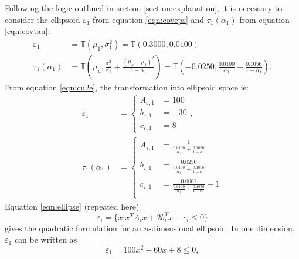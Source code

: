 \begin{example}
Following the logic outlined in section \ref{section:explanation}, it is
necessary to consider the ellipsoid $\varepsilon_1$ from equation \ref{eqn:coveps} and $\tau_1(\alpha_1)$ from equation
\ref{eqn:covtau}:
\begin{align}
    \varepsilon_1 &= \mathbb{T}\left(\mu_1,\sigma_1^2\right) = \mathbb{T}\left(0.3000,0.0100\right)\\
    \tau_1(\alpha_1) &= \mathbb{T}\left(\mu_u,\frac{\sigma_1^2}{\alpha_1}+\frac{(\mu_u-\mu_1)^2}{1-\alpha_1}\right)
        = \mathbb{T}\left(-0.0250,\frac{0.0100}{\alpha_1}+\frac{0.1056}{1-\alpha_1}\right).
\end{align}
From equation \ref{eqn:cu2e}, the transformation into ellipsoid space is:
\begin{align}
    \varepsilon_1 &= \left\{
        \begin{aligned}
            A_{\varepsilon,1} &= 100\\
            b_{\varepsilon,1} &= -30\\
            c_{\varepsilon,1} &= 8
        \end{aligned}\right.,\\\nonumber
    \tau_1(\alpha_1) &= \left\{
        \begin{aligned}
            A_{\tau,1} &= \frac{\begin{smallmatrix}1\end{smallmatrix}}{\frac{0.0100}{\alpha_1}+\frac{0.1056}{1-\alpha_1}} \\
            b_{\tau,1} &= \frac{\begin{smallmatrix}0.0250\end{smallmatrix}}{\frac{0.0100}{\alpha_1}+\frac{0.1056}{1-\alpha_1}} \\
            c_{\tau,1} &= \frac{\begin{smallmatrix}0.0062\end{smallmatrix}}{\frac{0.0100}{\alpha_1}+\frac{0.1056}{1-\alpha_1}} -1 \\
        \end{aligned}\right.
\end{align}
Equation \ref{eqn:ellipse} (repeated here)
\begin{equation}
    \varepsilon_i = \{ x | x^TA_ix + 2b_i^Tx + c_i \leq 0 \}\nonumber
\end{equation}
gives the quadratic formulation for an $n$-dimensional ellipsoid. In one dimension, $\varepsilon_1$ can be written as
\begin{equation}
    \varepsilon_1 = 100x^2-60x+8 \leq 0,

\end{equation}
\end{example}
